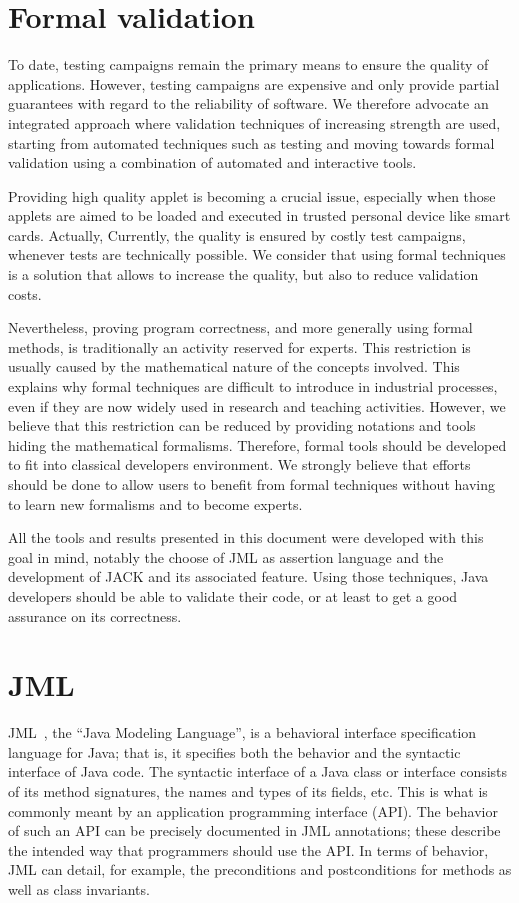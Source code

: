\section{Formal validation}
To date, testing campaigns remain the primary means to ensure the
quality of applications. However, testing campaigns are expensive
and only provide partial guarantees with regard to the reliability
of software. We therefore advocate an integrated approach where
validation techniques of increasing strength are used, starting
from automated techniques such as testing and moving towards formal
validation using a combination of automated and interactive tools.


Providing high quality applet is becoming a crucial issue, especially
when those applets are aimed to be loaded and executed in trusted
personal device like smart cards.  Actually,  Currently, the
quality is ensured by costly test campaigns, whenever tests are
technically possible. We consider that using formal techniques is a
solution that allows to increase the quality, but also to reduce
validation costs.

Nevertheless, proving program correctness, and more generally using
formal methods, is traditionally an activity reserved for experts.
This restriction is usually caused by the mathematical nature of the
concepts involved.  This explains why formal techniques are difficult
to introduce in industrial processes, even if they are now widely used
in research and teaching activities.  However, we believe that this
restriction can be reduced by providing notations and tools hiding the
mathematical formalisms.  Therefore, formal tools should be developed
to fit into classical developers environment.  We strongly believe
that efforts should be done to allow users to benefit from formal
techniques without having to learn new formalisms and to become
experts.

All the tools and results presented in this document were developed
with this goal in mind, notably the choose of JML as assertion
language and the development of JACK and its associated feature.
Using those techniques, Java developers should be able to validate
their code, or at least to get a good assurance on its correctness.




\section{JML}
JML~\cite{Leavens-Baker-Ruby99b,Leavens-Baker-Ruby03}, the
``Java Modeling Language'', is a behavioral interface
specification language for Java; that is, it specifies both the behavior
and the syntactic interface of Java code.  The syntactic interface of
a Java class or interface consists of its method signatures,
the names and types of its fields, etc.
This is what is commonly meant by an application programming
interface (API).
The behavior of such an API can be precisely documented in JML annotations;
these describe the intended way that programmers should
use the API.  In terms of behavior, JML can detail, for example, the
preconditions and postconditions for methods as well as class
invariants.

